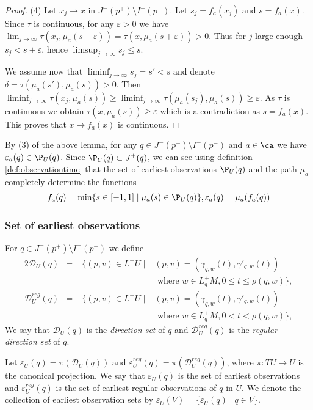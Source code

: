 \begin{proof}
(4) Let $x_j\to x$ in $J^-(p^+)\setminus I^-(p^-)$. Let $s_j = f_a(x_j)$ and $s=f_a(x)$. Since $\tau$ is continuous, for any $\varepsilon>0$ we have $\lim_{j\to \infty} \tau(x_j,\mu_a(s+\varepsilon)) = \tau(x,\mu_a(s+\varepsilon)) > 0$. Thus for $j$ large enough $s_j<s+\varepsilon$, hence $\limsup_{j\to \infty} s_j \leq s$.

We assume now that $\liminf_{j\to\infty} s_j = s' < s$ and denote $\delta = \tau(\mu_a(s'),\mu_a(s)) > 0$. Then $\liminf_{j\to\infty}\tau(x_j,\mu_a(s)) \geq \liminf_{j\to\infty}\tau(\mu_a(s_j),\mu_a(s))\geq \varepsilon$. As $\tau$ is continuous we obtain $\tau(x,\mu_a(s))\geq \varepsilon$ which is a contradiction as $s=f_a(x)$. This proves that $x\mapsto f_a(x)$ is continuous.
\end{proof}

By (3) of the above lemma, for any $q\in J^-(p^+)\setminus I^-(p^-)$ and $a\in \ca$ we have $\varepsilon_a(q)\in \P_U(q)$. Since $\P_U(q)\subset J^+(q)$, we can see using definition \ref{def:observationtime} that the set of earliest observations $\P_U(q)$ and the path $\mu_a$ completely determine the functions
\begin{align}\label{eq:observationtimerestated}
    f_a(q) = \min \{ s\in [-1,1] \mid \mu_a(s)\in \P_U(q) \}, \varepsilon_a(q) = \mu_a(f_a(q))
\end{align}


\subsubsection{Set of earliest observations}
\begin{definition}
For $q\in J^-(p^+)\setminus I^-(p^-)$ we define
\begin{alignat*}{2}
    \mathcal{D}_U(q) &=\; &\{(p,v)\in L^+U \mid &(p,v) = (\gamma_{q,w}(t),\gamma'_{q,w}(t)) \\
    &&&\text{ where } w\in L_q^+M, 0\leq t \leq \rho(q,w)\},\\
    \mathcal{D}^{reg}_U(q) &=\; &\{(p,v)\in L^+U \mid &(p,v) = (\gamma_{q,w}(t),\gamma'_{q,w}(t)) \\
    &&&\text{ where } w\in L_q^+M, 0 < t < \rho(q,w)\},
\end{alignat*}
We say that $\mathcal{D}_U(q)$ is the \emph{direction set} of $q$ and $\mathcal{D}^{reg}_U(q)$ is the \emph{regular direction set} of $q$.

Let $\varepsilon_U(q) = \pi(\mathcal{D}_U(q))$ and $\varepsilon^{reg}_U(q) = \pi(\mathcal{D}^{reg}_U(q))$, where $\pi:TU\to U$ is the canonical projection. We say that $\varepsilon_U(q)$ is the set of earliest observations and $\varepsilon^{reg}_U(q)$ is the set of earliest regular observations of $q$ in $U$. We denote the collection of earliest observation sets by $\varepsilon_U(V) = \{ \varepsilon_U(q) \mid q\in V\}$.
\end{definition}

